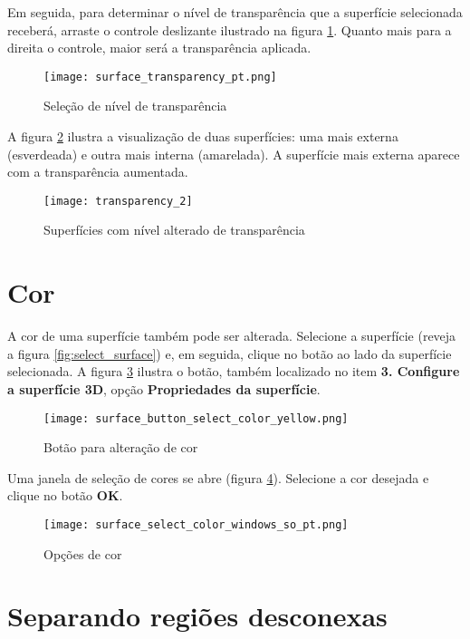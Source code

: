 Em seguida, para determinar o nível de transparência que a superfície selecionada receberá, arraste
o controle deslizante ilustrado na figura \ref{fig:select_transparency}. Quanto mais para a direita
o controle, maior será a transparência aplicada.

\begin{figure}[!htb]
\centering
\texttt{[image: surface\_transparency\_pt.png]}
\caption{Seleção de nível de transparência}
\label{fig:select_transparency}
\end{figure}

A figura \ref{fig:model_transparency} ilustra a visualização de duas superfícies: uma mais externa
(esverdeada) e outra mais interna (amarelada). A superfície mais externa aparece com a transparência
aumentada.

\begin{figure}[!htb]
\centering
\texttt{[image: transparency\_2]}
\caption{Superfícies com nível alterado de transparência}
\label{fig:model_transparency}
\end{figure}

\newpage

\section{Cor}

A cor de uma superfície também pode ser alterada. Selecione a superfície (reveja a figura
\ref{fig:select_surface}) e, em seguida, clique no botão ao lado da superfície selecionada. A figura
\ref{fig:change_surface_color} ilustra o botão, também localizado no item \textbf{3. Configure a
superfície 3D}, opção \textbf{Propriedades da superfície}.

\begin{figure}[!htb]
\centering
\texttt{[image: surface\_button\_select\_color\_yellow.png]}
\caption{Botão para alteração de cor}
\label{fig:change_surface_color}
\end{figure}

Uma janela de seleção de cores se abre (figura \ref{fig:button_select_color}). Selecione a cor
desejada e clique no botão \textbf{OK}.

\begin{figure}[!htb]
\centering
\texttt{[image: surface\_select\_color\_windows\_so\_pt.png]}
\caption{Opções de cor}
\label{fig:button_select_color}
\end{figure}

\section{Separando regiões desconexas}

